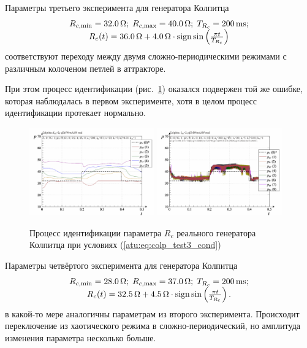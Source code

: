 Параметры третьего эксперимента для генератора Колпитца
%
\begin{equation}
  \begin{array}{c}
    R_{c,\min} = \SI{32.0}{\ohm};
    \;
    R_{c,\max} = \SI{40.0}{\ohm};
    \;
    T_{R_c} = \SI{200}{\milli\second};
  \\
    R_c(t) = \SI{36.0}{\ohm} + \SI{4.0}{\ohm} \cdot \operatorname*{sign} \sin \left(   \frac{\pi t}{T_{R_c}}   \right)
  \end{array}
  \label{atu:eq:colp_test3_cond}
\end{equation}
%
соответствуют переходу между двумя сложно-периодическими режимами
с различным колоченом петлей в аттракторе.

При этом процесс идентификации (рис.~\ref{atu:f:colp_r_id_3}) оказался подвержен
той же ошибке, которая наблюдалась в первом эксперименте,
хотя в целом процесс идентификации протекает нормально.


\begin{figure}[htb!]
  \centerline{
    \includegraphics[width=0.48\textwidth]{p/r/colp_real_id-p_t_pi_ql3rlWvnAAW_real_d_2.png}
    \hfill
    \includegraphics[width=0.48\textwidth]{p/r/colp_real_id-p_t_p_ql3rlWvnAAW_real_d_2.png}
  }
  \caption{Процесс идентификации параметра $R_c$ реального генератора Колпитца при условиях (\ref{atu:eq:colp_test3_cond})}
  \label{atu:f:colp_r_id_3}
\end{figure}



Параметры четвёртого эксперимента для генератора Колпитца
%
\begin{equation}
  \begin{array}{c}
    R_{c,\min} = \SI{28.0}{\ohm};
    \;
    R_{c,\max} = \SI{37.0}{\ohm};
    \;
    T_{R_c} = \SI{200}{\milli\second};
  \\
    R_c(t) = \SI{32.5}{\ohm} + \SI{4.5}{\ohm} \cdot \operatorname*{sign} \sin \left( \frac{\pi t}{T_{R_c}}  \right).
  \end{array}
  \label{atu:eq:colp_test4_cond}
\end{equation}
%
в какой-то мере аналогичны параметрам из второго эксперимента.
Происходит переключение из хаотического режима в сложно-периодический,
но амплитуда изменения параметра несколько больше.

